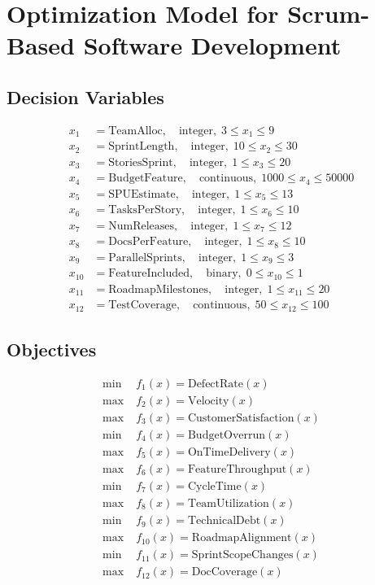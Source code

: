 \documentclass{article}
\begin{document}
\section*{Optimization Model for Scrum-Based Software Development}

\subsection*{Decision Variables}
\begin{align*}
x_1 &= \text{TeamAlloc},\quad \text{integer},\;3 \le x_1 \le 9\\
x_2 &= \text{SprintLength},\quad \text{integer},\;10 \le x_2 \le 30\\
x_3 &= \text{StoriesSprint},\quad \text{integer},\;1 \le x_3 \le 20\\
x_4 &= \text{BudgetFeature},\quad \text{continuous},\;1000 \le x_4 \le 50000\\
x_5 &= \text{SPUEstimate},\quad \text{integer},\;1 \le x_5 \le 13\\
x_6 &= \text{TasksPerStory},\quad \text{integer},\;1 \le x_6 \le 10\\
x_7 &= \text{NumReleases},\quad \text{integer},\;1 \le x_7 \le 12\\
x_8 &= \text{DocsPerFeature},\quad \text{integer},\;1 \le x_8 \le 10\\
x_9 &= \text{ParallelSprints},\quad \text{integer},\;1 \le x_9 \le 3\\
x_{10} &= \text{FeatureIncluded},\quad \text{binary},\;0 \le x_{10} \le 1\\
x_{11} &= \text{RoadmapMilestones},\quad \text{integer},\;1 \le x_{11} \le 20\\
x_{12} &= \text{TestCoverage},\quad \text{continuous},\;50 \le x_{12} \le 100
\end{align*}

\subsection*{Objectives}
\begin{align*}
\min\; &f_1(x) = \text{DefectRate}(x) \\
\max\; &f_2(x) = \text{Velocity}(x) \\
\max\; &f_3(x) = \text{CustomerSatisfaction}(x) \\
\min\; &f_4(x) = \text{BudgetOverrun}(x) \\
\max\; &f_5(x) = \text{OnTimeDelivery}(x) \\
\max\; &f_6(x) = \text{FeatureThroughput}(x) \\
\min\; &f_7(x) = \text{CycleTime}(x) \\
\max\; &f_8(x) = \text{TeamUtilization}(x) \\
\min\; &f_9(x) = \text{TechnicalDebt}(x) \\
\max\; &f_{10}(x) = \text{RoadmapAlignment}(x) \\
\min\; &f_{11}(x) = \text{SprintScopeChanges}(x) \\
\max\; &f_{12}(x) = \text{DocCoverage}(x)
\end{align*}
\end{document}
